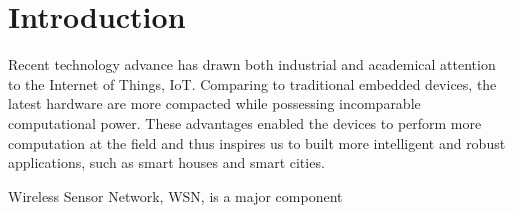 \chapter{Introduction}
%
%
%
Recent technology advance has drawn both industrial and academical attention  to the Internet of Things, IoT. Comparing to traditional embedded devices, the latest hardware are more compacted while possessing incomparable computational power. These advantages enabled the devices to perform more computation at the field and thus inspires us to built more intelligent and robust applications, such as smart houses and smart cities. 

Wireless Sensor Network, WSN, is a major component 